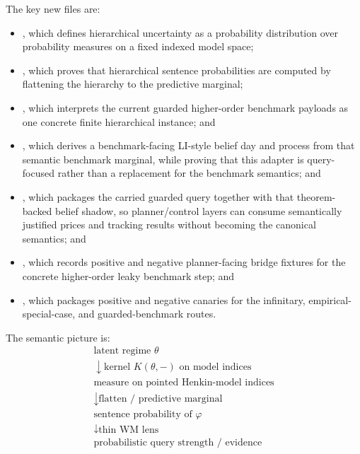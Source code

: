 \documentclass[11pt,openany]{report}
\begin{document}
The key new files are:
\begin{itemize}
\item {},
  which defines hierarchical uncertainty as a probability distribution over
  probability measures on a fixed indexed model space;
\item {}, which
  proves that hierarchical sentence probabilities are computed by flattening the
  hierarchy to the predictive marginal;
\item {}, which
  interprets the current guarded higher-order benchmark payloads as one concrete
  finite hierarchical instance; and
\item {},
  which derives a benchmark-facing LI-style belief day and process from that
  semantic benchmark marginal, while proving that this adapter is
  query-focused rather than a replacement for the benchmark semantics; and
\item {}, which packages
  the carried guarded query together with that theorem-backed belief shadow, so
  planner/control layers can consume semantically justified prices and tracking
  results without becoming the canonical semantics; and
\item {}, which
  records positive and negative planner-facing bridge fixtures for the concrete
  higher-order leaky benchmark step; and
\item {},
  which packages positive and negative canaries for the infinitary,
  empirical-special-case, and guarded-benchmark routes.
\end{itemize}

The semantic picture is:
\[
\begin{array}{c}
\text{latent regime } \theta \\
\downarrow\scriptstyle{\text{kernel } K(\theta, -) \text{ on model indices}} \\
\text{measure on pointed Henkin-model indices} \\
\downarrow\scriptstyle{\text{flatten / predictive marginal}} \\
\text{sentence probability of } \varphi \\
\downarrow\scriptstyle{\text{thin WM lens}} \\
\text{probabilistic query strength / evidence}
\end{array}
\]
\end{document}
